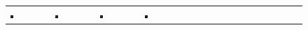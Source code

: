 \documentclass[letterpaper]{article} %
\begin{document}
\begin{figure}[!h]
\begin{tabular}{ C{1.07cm}C{1.07cm}C{1.07cm}C{1.07cm}C{1.07cm}C{1.07cm}C{1.07cm}C{1.07cm}C{1.07cm}C{1.07cm}C{1.07cm}C{1.07cm}C{1.07cm}C{1.07cm}C{1.07cm}C{1.07cm} }
    \includegraphics[width=0.070\textwidth]{"images/supp_fig_mnist/seq_3/pred_4"}&
    \includegraphics[width=0.070\textwidth]{"images/supp_fig_mnist/seq_3/pred_5"}&
    \includegraphics[width=0.070\textwidth]{"images/supp_fig_mnist/seq_3/pred_6"}&
    \includegraphics[width=0.070\textwidth]{"images/supp_fig_mnist/seq_3/pred_7"}\\
    

\end{tabular}
\end{figure}
\end{document}
